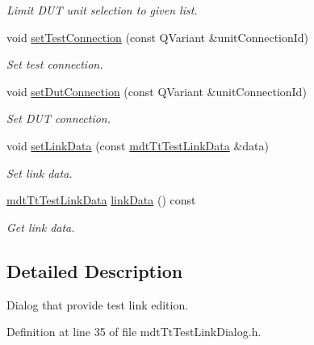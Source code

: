 \begin{DoxyCompactItemize}
\begin{DoxyCompactList}\small\item\em Limit D\-U\-T unit selection to given list. \end{DoxyCompactList}\item 
void \hyperlink{classmdt_tt_test_link_dialog_a0466396e733c0e20f5c8fe1cc11fb8ec}{set\-Test\-Connection} (const Q\-Variant \&unit\-Connection\-Id)
\begin{DoxyCompactList}\small\item\em Set test connection. \end{DoxyCompactList}\item 
void \hyperlink{classmdt_tt_test_link_dialog_a3fc219ea7c9e271848f181ed00ca7156}{set\-Dut\-Connection} (const Q\-Variant \&unit\-Connection\-Id)
\begin{DoxyCompactList}\small\item\em Set D\-U\-T connection. \end{DoxyCompactList}\item 
void \hyperlink{classmdt_tt_test_link_dialog_ad5ba0637cab1c517a541742abc1dfbb4}{set\-Link\-Data} (const \hyperlink{classmdt_tt_test_link_data}{mdt\-Tt\-Test\-Link\-Data} \&data)
\begin{DoxyCompactList}\small\item\em Set link data. \end{DoxyCompactList}\item 
\hyperlink{classmdt_tt_test_link_data}{mdt\-Tt\-Test\-Link\-Data} \hyperlink{classmdt_tt_test_link_dialog_a0af064a9831a15e5b0478e9346d802c6}{link\-Data} () const 
\begin{DoxyCompactList}\small\item\em Get link data. \end{DoxyCompactList}\end{DoxyCompactItemize}


\subsection{Detailed Description}
Dialog that provide test link edition. 

Definition at line 35 of file mdt\-Tt\-Test\-Link\-Dialog.\-h.



